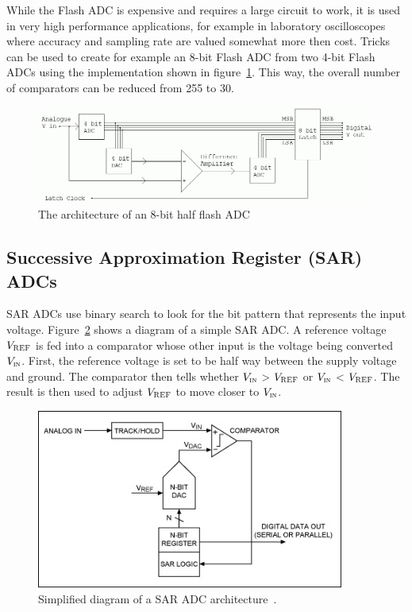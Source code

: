 \documentclass[11pt,a4paper,titlepage]{article}
\begin{document}
	\noindent While the Flash ADC is expensive and requires a large circuit to work, it is used in very high performance applications, for example in laboratory oscilloscopes where accuracy and sampling rate are valued somewhat more then cost. Tricks can be used to create for example an 8-bit Flash ADC from two 4-bit Flash ADCs using the implementation shown in figure~\ref{fig:halfflashadc}. This way, the overall number of comparators can be reduced from 255 to 30.
	
	\begin{figure}[H]
		\centering
		\includegraphics[width=\textwidth]{graphics/halfflashadc}
		\caption{The architecture of an 8-bit half flash ADC~\cite{halfflash}}
		\label{fig:halfflashadc}
	\end{figure}
	
	\subsection{Successive Approximation Register (SAR) ADCs}
	SAR ADCs use binary search to look for the bit pattern that represents the input voltage.
	Figure~\ref{fig:saradc} shows a diagram of a simple SAR ADC.
	A reference voltage $V_{\textsc{REF}}$ is fed into a comparator whose other input is the voltage being converted $V_{\textsc{in}}$.
	First, the reference voltage is set to be half way between the supply voltage and ground.
	The comparator then tells whether $V_{\textsc{in}}$ > $V_{\textsc{REF}}$ or $V_{\textsc{in}}$ < $V_{\textsc{REF}}$.
	The result is then used to adjust $V_{\textsc{REF}}$ to move closer to $V_{\textsc{in}}$.
	
	\begin{figure}[H]
		\centering
		\includegraphics[width=0.9\textwidth]{graphics/saradc}
		\caption{Simplified diagram of a SAR ADC architecture~\cite{saradc}.}
		\label{fig:saradc}
	\end{figure}
	
\end{document}
